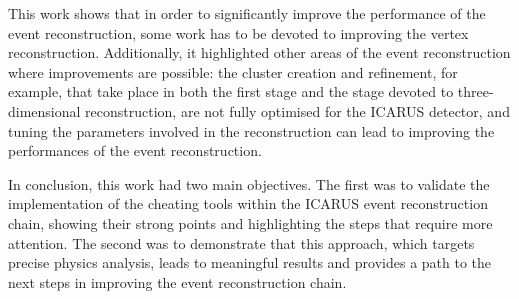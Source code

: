 This work shows that in order to significantly improve the performance of the event reconstruction, some work has to be devoted to improving the vertex reconstruction. Additionally, it highlighted other areas of the event reconstruction where improvements are possible: the cluster creation and refinement, for example, that take place in both the first stage and the stage devoted to three-dimensional reconstruction, are not fully optimised for the ICARUS detector, and tuning the parameters involved in the reconstruction can lead to improving the performances of the event reconstruction. 

In conclusion, this work had two main objectives. The first was to validate the implementation of the cheating tools within the ICARUS event reconstruction chain, showing their strong points and highlighting the steps that require more attention. The second was to demonstrate that this approach, which targets precise physics analysis, leads to meaningful results and provides a path to the next steps in improving the event reconstruction chain. 

